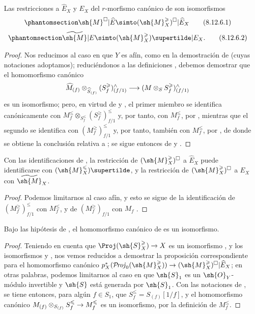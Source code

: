 \documentclass[oneside,10pt]{amsart}
\makeatletter
\renewcommand{\leq}{\leqslant}
\renewcommand{\geq}{\geqslant}
\newcommand{\ega@arrow}[2]{\mathchoice{#1}{#2}{#2}{#2}}
\renewcommand{\to}{\ega@arrow{\longrightarrow}{\rightarrow}}
\def\shProj{\mathcal{P}\!\mathit{roj}}
\newcommand{\oldpage}[2][]{\marginnote{\normalfont\footnotesize\textbf{#1}~|~#2}\ignorespaces}
\let\EGAOriginalLabel\label
\renewcommand{\label}[1]{\phantomsection\EGAOriginalLabel{#1}}
\makeatother
\begin{document}
\begin{proposition}[8.12.6]
\label{II.8.12.6}
Las restricciones a $\widehat{E}_X$ y $E_X$ del $r$-morfismo canónico de  son isomorfismos
\[
\label{II.8.12.6.1}
    \sh{M}^\square|\widehat{E} \simto (\sh{M}_X^\geq)^\square|\widehat{E}_X
\tag{8.12.6.1}
\]
\[
\label{II.8.12.6.2}
    \widetilde{\sh{M}}|E \simto (\sh{M}_X^\geq)\supertilde|E_X.
\tag{8.12.6.2}
\]
\end{proposition}

\begin{proof}
Nos reducimos al caso en que $Y$ es afín, como en la demostración de  (cuyas notaciones adoptamos);
reduciéndonos a las definiciones , debemos demostrar que el homomorfismo canónico
\[
    \widehat{M}_{(f)}\otimes_{\widehat{S}_{(f)}}(S_f^\geq)_{(f/1)}^\wedge \to (M\otimes_S S_f^\geq)_{(f/1)}^\wedge
\]
es un isomorfismo;
pero, en virtud de  y , el primer miembro se identifica canónicamente con $M_f^\leq\otimes_{S_f^\leq}(S_f^\geq)_{f/1}^\leq$ y, por tanto, con $M_f^\leq$, por , mientras que el segundo se identifica con $(M_f^\geq)_{f/1}^\leq$ y, por tanto, también con $M_f^\leq$, por , de donde se obtiene la conclusión relativa a ;
 se sigue entonces de  y .
\end{proof}

\begin{corollary}[8.12.7]
\label{II.8.12.7}
Con las identificaciones de , la restricción de $(\sh{M}_X^\geq)^\square$ a $\widehat{E}_X$ puede identificarse con $(\sh{M}_X^\leq)\supertilde$, y la restricción de $(\sh{M}_X^\geq)^\square$ a $E_X$ con $\widetilde{\sh{M}}_X$.
\end{corollary}

\begin{proof}
Podemos limitarnos al caso afín, y esto se sigue de la identificación de $(M_f^\geq)_{f/1}^\leq$ con $M_f^\leq$, y de $(M_f^\geq)_{f/1}$ con $M_f$ .
\end{proof}

\begin{proposition}[8.12.8]
\label{II.8.12.8}
Bajo las hipótesis de , el homomorfismo canónico de  es un isomorfismo.
\end{proposition}

\begin{proof}
Teniendo en cuenta que $\Proj(\sh{S}_X^\geq)\to X$ es un isomorfismo , y los
\oldpage[II]{195}
isomorfismos  y , nos vemos reducidos a demostrar la proposición correspondiente para el homomorfismo canónico $p_X^*(\shProj_0(\sh{M}_X^\geq))\to(\sh{M}_X^\geq)^\square|\widehat{E}_X$; en otras palabras, podemos limitarnos al caso en que $\sh{S}_1$ es un $\sh{O}_Y$-módulo invertible y $\sh{S}$ está generada por $\sh{S}_1$.
Con las notaciones de , se tiene entonces, para algún $f\in S_1$, que $S_f^\leq=S_{(f)}[1/f]$, y el homomorfismo canónico $M_{(f)}\otimes_{S_{(f)}}S_f^\leq\to M_f^\leq$ es un isomorfismo, por la definición de $M_f^\leq$.
\end{proof}
\end{document}
